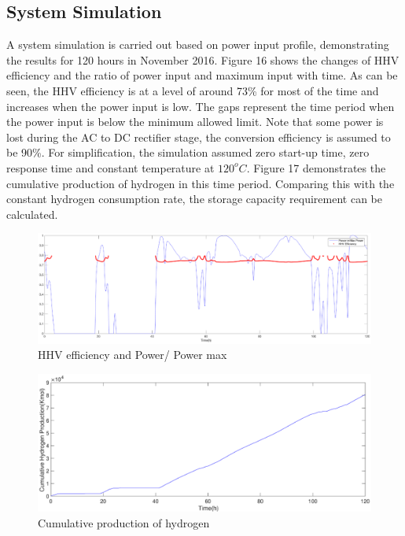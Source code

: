 \subsection{System Simulation}
A system simulation is carried out based on power input profile,  demonstrating the results for 120 hours in November 2016.  Figure 16  shows the changes of  HHV efficiency and the ratio of power input and maximum input with time. As can be seen, the HHV efficiency is at a level of around 73\% for most of the time and increases when the power input is low. The gaps represent the time period when the power input is below the minimum allowed limit. Note that some power is lost during the AC to DC rectifier stage, the conversion efficiency is assumed to be 90\%. For simplification, the simulation assumed zero start-up time, zero response time and constant temperature at $120^oC$. Figure 17 demonstrates the cumulative production of hydrogen in this time period. Comparing this with the constant hydrogen consumption rate, the storage capacity requirement can be calculated. 
\begin{figure}[htb]
\centering
\includegraphics[width = 18cm]{simulation.eps}
\caption{HHV efficiency and Power/ Power max}
\end{figure}

\begin{figure}[htb]
\centering
\includegraphics[width = 17cm]{cumulative.eps}
\caption{Cumulative production of hydrogen }
\end{figure}
